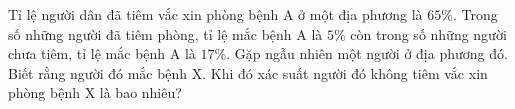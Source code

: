 \begin{ex}%
Tỉ lệ người dân đã tiêm vắc xin phòng bệnh A ở một địa phương là $65\%$. Trong số những  người đã tiêm phòng, tỉ lệ mắc bệnh A là $5\%$ còn trong số những người chưa tiêm, tỉ lệ mắc bệnh A là $17\%$. Gặp ngẫu nhiên một người ở địa phương đó. Biết rằng người đó mắc bệnh X. Khi đó xác suất người đó không tiêm vắc xin phòng bệnh X là bao nhiêu?
\end{ex}


